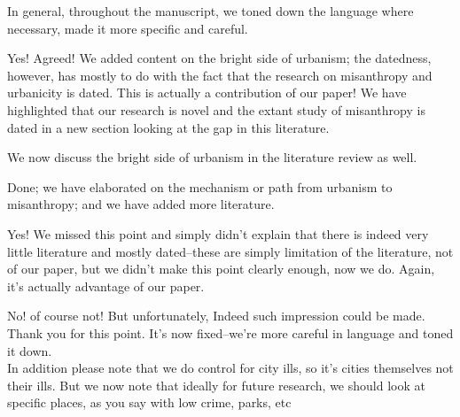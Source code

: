 In general, throughout the manuscript, we toned down the language where necessary, made it more specific and careful.
 

Yes! Agreed! We added content on the bright side of urbanism; the datedness,
however, has mostly to do with the fact that the research on misanthropy and
urbanicity is dated. This is actually  a contribution of our paper! We have highlighted that our research is novel and the extant study of misanthropy is dated in a new section looking at the gap in this literature. 

We now discuss the bright side of urbanism in the literature review as well. 


Done; we have elaborated on the mechanism or path from urbanism to misanthropy; and we have added more literature. 



Yes! We missed this point and simply didn't explain that there is indeed very
little literature and mostly dated--these are simply limitation of the
literature, not of our paper, but we didn't make this point clearly enough, now we
do. Again, it's actually advantage of our paper. 


No! of course not! But unfortunately, Indeed such impression could be made. Thank
you for this point. It's now fixed--we're more careful in language and toned it
down.\\

In addition please note that we do control for city ills, so it's cities
themselves not their ills. But we now note that ideally for future research, we
should look at specific places, as you say with low crime, parks, etc   




